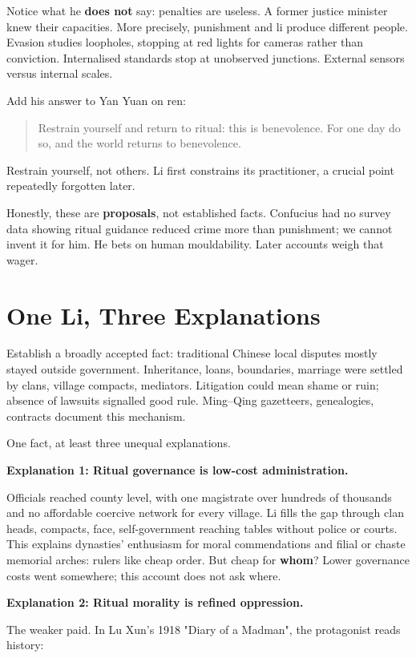 Notice what he \textbf{does not} say: penalties are useless. A former justice minister knew their capacities. More precisely, punishment and li produce different people. Evasion studies loopholes, stopping at red lights for cameras rather than conviction. Internalised standards stop at unobserved junctions. External sensors versus internal scales.

Add his answer to Yan Yuan on ren:

\begin{quote}
Restrain yourself and return to ritual: this is benevolence. For one day do so, and the world returns to benevolence.
\end{quote}
Restrain yourself, not others. Li first constrains its practitioner, a crucial point repeatedly forgotten later.

Honestly, these are \textbf{proposals}, not established facts. Confucius had no survey data showing ritual guidance reduced crime more than punishment; we cannot invent it for him. He bets on human mouldability. Later accounts weigh that wager.

\section{One Li, Three Explanations}
Establish a broadly accepted fact: traditional Chinese local disputes mostly stayed outside government. Inheritance, loans, boundaries, marriage were settled by clans, village compacts, mediators. Litigation could mean shame or ruin; absence of lawsuits signalled good rule. Ming--Qing gazetteers, genealogies, contracts document this mechanism.

One fact, at least three unequal explanations.

\textbf{Explanation 1: Ritual governance is low-cost administration.}

Officials reached county level, with one magistrate over hundreds of thousands and no affordable coercive network for every village. Li fills the gap through clan heads, compacts, face, self-government reaching tables without police or courts. This explains dynasties' enthusiasm for moral commendations and filial or chaste memorial arches: rulers like cheap order. But cheap for \textbf{whom}? Lower governance costs went somewhere; this account does not ask where.

\textbf{Explanation 2: Ritual morality is refined oppression.}

The weaker paid. In Lu Xun's 1918 "Diary of a Madman", the protagonist reads history:

